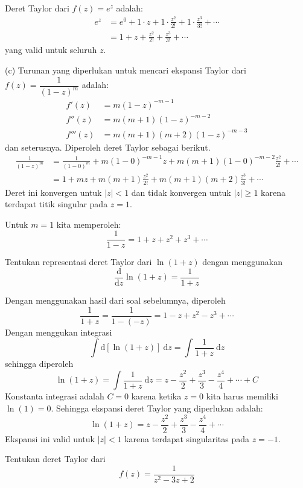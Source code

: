 Deret Taylor dari $f(z)=e^{z}$ adalah:
\begin{align*}
e^{z} & =e^{0}+1\cdot z+1\cdot\frac{z^{2}}{2!}+1\cdot\frac{z^{3}}{3!}+\cdots\\
 & =1+z+\frac{z^{2}}{2!}+\frac{z^{3}}{3!}+\cdots
\end{align*}
yang valid untuk seluruh $z$.

(c) Turunan yang diperlukan untuk mencari ekspansi Taylor dari $f(z)=\dfrac{1}{\left(1-z\right)^{m}}$
adalah:
\begin{align*}
f'(z) & =m(1-z)^{-m-1}\\
f''(z) & =m(m+1)(1-z)^{-m-2}\\
f'''(z) & =m(m+1)(m+2)(1-z)^{-m-3}
\end{align*}
dan seterusnya. Diperoleh deret Taylor sebagai berikut.
\begin{align*}
\frac{1}{(1-z)^{m}} & =\frac{1}{(1-0)^{m}}+m(1-0)^{-m-1}z+m(m+1)(1-0)^{-m-2}\frac{z^{2}}{2!}+\cdots\\
 & =1+mz+m(m+1)\frac{z^{2}}{2!}+m(m+1)(m+2)\frac{z^{3}}{3!}+\cdots
\end{align*}
Deret ini konvergen untuk $|z|<1$ dan tidak konvergen untuk $|z|\geq1$
karena terdapat titik singular pada $z=1$.

Untuk $m=1$ kita memperoleh:
\[
\frac{1}{1-z}=1+z+z^{2}+z^{3}+\cdots
\]

\begin{contoh}
Tentukan representasi deret Taylor dari $\ln(1+z)$ dengan menggunakan
\begin{equation*}
\frac{\mathrm{d}}{\mathrm{d}z}\ln(1+z)=\frac{1}{1+z}
\end{equation*}
\end{contoh}

Dengan menggunakan hasil dari soal sebelumnya, diperoleh
\[
\frac{1}{1+z}=\frac{1}{1-(-z)}=1-z+z^{2}-z^{3}+\cdots
\]
Dengan menggukan integrasi
\[
\int\mathrm{d}\left[\ln(1+z)\right]\ \mathrm{d}z=\int\frac{1}{1+z}\ \mathrm{d}z
\]
sehingga diperoleh
\[
\ln(1+z)=\int\frac{1}{1+z}\ \mathrm{d}z=z-\frac{z^{2}}{2}+\frac{z^{3}}{3}-\frac{z^{4}}{4}+\cdots+C
\]
Konstanta integrasi adalah $C=0$ karena ketika $z=0$ kita harus
memiliki $\ln(1)=0$. Sehingga ekspansi deret Taylor yang diperlukan
adalah:
\[
\ln(1+z)=z-\frac{z^{2}}{2}+\frac{z^{3}}{3}-\frac{z^{4}}{4}+\cdots
\]
Ekspansi ini valid untuk $|z|<1$ karena terdapat singularitas pada
$z=-1$.

\begin{contoh}
Tentukan deret Taylor dari
\[
f(z)=\frac{1}{z^{2}-3z+2}
\]
\end{contoh}

